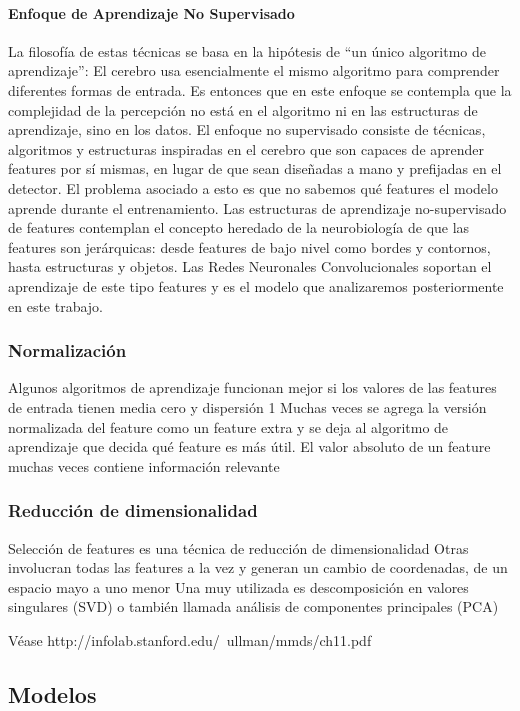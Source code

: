 \documentclass[a4paper,12pt,spanish]{book}
\begin{document}
	  \paragraph{Enfoque de Aprendizaje No Supervisado} 
	    La filosofía de estas técnicas se basa en la hipótesis de “un único algoritmo de aprendizaje”: El cerebro usa esencialmente el mismo algoritmo para comprender diferentes formas de entrada. 
	    Es entonces que en este enfoque se contempla que la complejidad de la percepción no está en el algoritmo ni en las estructuras de aprendizaje, sino en los datos. 
	    El enfoque no supervisado consiste de técnicas, algoritmos y estructuras inspiradas en el cerebro que son capaces de aprender features por sí mismas, 
	    en lugar de que sean diseñadas a mano y prefijadas en el detector. El problema asociado a esto es que no sabemos qué features el modelo aprende durante el entrenamiento.
	    Las estructuras de aprendizaje no-supervisado de features contemplan el concepto heredado de la neurobiología de que las features son jerárquicas: 
	    desde features de bajo nivel como bordes y contornos, hasta estructuras y objetos. Las Redes Neuronales Convolucionales soportan el aprendizaje de este tipo features 
	    y es el modelo que analizaremos posteriormente en este trabajo.


      \subsubsection{Normalización}
	Algunos algoritmos de aprendizaje funcionan mejor si los valores de las features de entrada tienen media cero y dispersión 1
	Muchas veces se agrega la versión normalizada del feature como un feature extra y se deja al algoritmo de aprendizaje que decida qué feature es más útil.
	El valor absoluto de un feature muchas veces contiene información relevante

      \subsubsection{Reducción de dimensionalidad}
	Selección de features es una técnica de reducción de dimensionalidad
	Otras involucran todas las features a la vez y generan un cambio de coordenadas, de un espacio mayo a uno menor
	Una muy utilizada es descomposición en valores singulares (SVD) o también llamada análisis de componentes principales (PCA)

	Véase http://infolab.stanford.edu/~ullman/mmds/ch11.pdf


      \subsection{Modelos}
\end{document}
